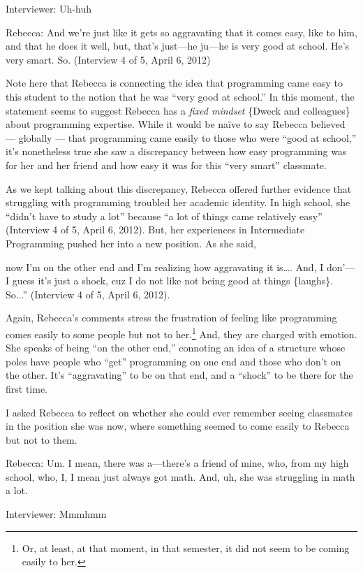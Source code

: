Interviewer: Uh-huh

Rebecca: And we're just like it gets so aggravating that it comes easy,
like to him, and that he does it well, but, that's just---he ju---he is
very good at school. He's very smart. So. (Interview 4 of 5, April 6,
2012)

Note here that Rebecca is connecting the idea that programming came easy
to this student to the notion that he was ``very good at school.'' In
this moment, the statement seems to suggest Rebecca has a \emph{fixed
mindset} \{Dweck and colleagues\} about programming expertise. While it
would be naïve to say Rebecca believed --- globally --- that programming
came easily to those who were ``good at school,'' it's nonetheless true
she saw a discrepancy between how easy programming was for her and her
friend and how easy it was for this ``very smart'' classmate.

As we kept talking about this discrepancy, Rebecca offered further
evidence that struggling with programming troubled her academic
identity. In high school, she ``didn't have to study a lot'' because ``a
lot of things came relatively easy'' (Interview 4 of 5, April 6, 2012).
But, her experiences in Intermediate Programming pushed her into a new
position. As she said,

now I'm on the other end and I'm realizing how aggravating it
is\ldots{}. And, I don'---I guess it's just a shock, cuz I do not like
not being good at things \{laughs\}. So...'' (Interview 4 of 5, April 6,
2012).

Again, Rebecca's comments stress the frustration of feeling like
programming comes easily to some people but not to her.\footnote{Or, at
  least, at that moment, in that semester, it did not seem to be coming
  easily to her.} And, they are charged with emotion. She speaks of
being ``on the other end,'' connoting an idea of a structure whose poles
have people who ``get'' programming on one end and those who don't on
the other. It's ``aggravating'' to be on that end, and a ``shock'' to be
there for the first time.

I asked Rebecca to reflect on whether she could ever remember seeing
classmates in the position she was now, where something seemed to come
easily to Rebecca but not to them.

Rebecca: Um. I mean, there was a---there's a friend of mine, who, from
my high school, who, I, I mean just always got math. And, uh, she was
struggling in math a lot.

Interviewer: Mmmhmm

